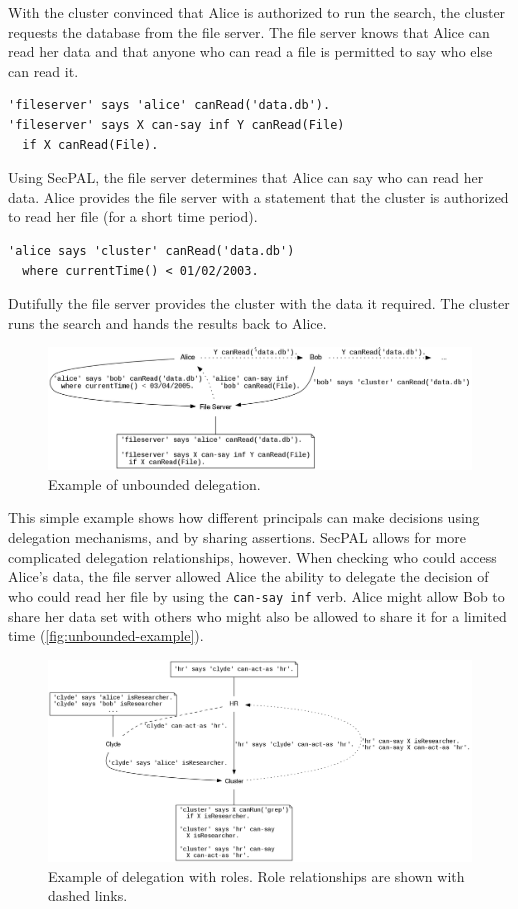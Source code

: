 \documentclass[thesis.tex]{subfiles}
\begin{document}
With the cluster convinced that Alice is authorized to run the search,
the cluster requests the database from the file server.  The file
server knows that Alice can read her data and that anyone who can read
a file is permitted to say who else can read it.
\begin{lstlisting}
'fileserver' says 'alice' canRead('data.db').
'fileserver' says X can-say inf Y canRead(File)
  if X canRead(File).
\end{lstlisting}
Using SecPAL, the file server determines that Alice can say who can
read her data.  Alice provides the file server with a statement that
the cluster is authorized to read her file (for a short time
period).
\begin{lstlisting}
'alice says 'cluster' canRead('data.db')
  where currentTime() < 01/02/2003.
\end{lstlisting}
Dutifully the file server provides the cluster with the data
it required.  The cluster runs the search and hands the results back to Alice.

\begin{figure}
  \centering
  \includegraphics[width=\textwidth]{figures/secpal-example-delegation.png}
  \caption{Example of unbounded delegation.}
  \label{fig:unbounded-example}
\end{figure}

This simple example shows how different principals can make decisions using delegation mechanisms, and by sharing assertions.
SecPAL allows for more complicated delegation relationships, however. When checking who could access Alice's data, the file server allowed Alice the ability to delegate the decision of who could read her file by using the \texttt{can-say inf} verb.
Alice might allow Bob to share her data set with others who might also be allowed to share it for a limited time (\autoref{fig:unbounded-example}).

\begin{figure}
  \centering
  \includegraphics[width=\textwidth]{figures/secpal-example-roles.png}
  \caption[Example of delegation with roles.]{Example of delegation with roles.  Role relationships are shown with dashed links.}
  \label{fig:roles-example}
\end{figure}
\end{document}
